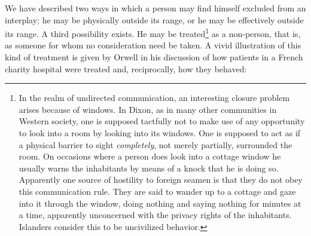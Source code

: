 \documentclass[twoside,symmetric,nobib,justified]{tufte-book}
\begin{document}
\newpage We have described two ways in which a person may find himself excluded
from an interplay; he may be physically outside its range, or he may be
effectively outside its range. A third possibility exists. He may be
treated\footnote{In the realm of undirected communication, an
  interesting closure problem arises because of windows. In Dixon, as in
  many other communities in Western society, one is supposed tactfully
  not to make use of any opportunity to look into a room by looking into
  its windows. One is supposed to act as if a physical barrier to sight
  \emph{completely}, not merely partially, surrounded the room. On
  occasions where a person does look into a cottage window he usually
  warns the inhabitants by means of a knock that he is doing so.
  Apparently one source of hostility to foreign seamen is that they do
  not obey this communication rule. They are said to wander up to a
  cottage and gaze into it through the window, doing nothing and saying
  nothing for minutes at a time, apparently unconcerned with the privacy
  rights of the inhabitants. Islanders consider this to be uncivilized
  behavior.} as a non-person, that is, as someone for whom no
consideration need be taken. A vivid illustration of this kind of
treatment is given by Orwell in his discussion of how patients in a
French charity hospital were treated and, reciprocally, how they
behaved:
\end{document}
